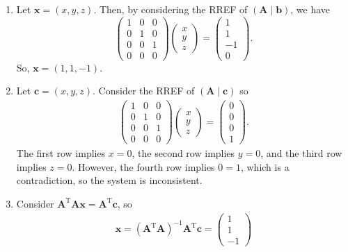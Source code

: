 \documentclass[12pt]{article}
\begin{document}
\begin{enumerate}[label=\textbf{(\alph*)}]
    \itemsep 0em
    \item Let $\mathbf{x}=\left(x,y,z\right)$. Then, by considering the RREF of $\left(\mathbf{A}\mid \mathbf{b}\right)$, we have \[\begin{pmatrix}1&0&0\\ 0&1&0\\ 0&0&1\\ 0&0&0\end{pmatrix}\begin{pmatrix}
        x\\y\\z
    \end{pmatrix}=\begin{pmatrix}
        1\\1\\-1\\0
    \end{pmatrix}.\]
    So, $\mathbf{x}=\left(1,1,-1\right)$.
    \item Let $\mathbf{c}=\left(x,y,z\right)$. Consider the RREF of $\left(\mathbf{A}\mid \mathbf{c}\right)$ so \begin{align*}
        \begin{pmatrix}
            1 &0 &0 \\ 0&1&0\\0&0&1\\0&0&0
        \end{pmatrix}\begin{pmatrix}
            x\\y\\z
        \end{pmatrix}=\begin{pmatrix}
            0\\0\\0\\1
        \end{pmatrix}.
    \end{align*}
    The first row implies $x=0$, the second row implies $y=0$, and the third row implies $z=0$. However, the fourth row implies $0=1$, which is a contradiction, so the system is inconsistent.
    \item Consider $\mathbf{A}^\text{T}\mathbf{Ax}=\mathbf{A}^\text{T}\mathbf{c}$, so \begin{align*}
        \mathbf{x}=\left(\mathbf{A}^\text{T}\mathbf{A}\right)^{-1}\mathbf{A}^\text{T}\mathbf{c}=\begin{pmatrix}1\\ 1\\ -1\end{pmatrix}

\end{align*}
\end{enumerate}
\end{document}
